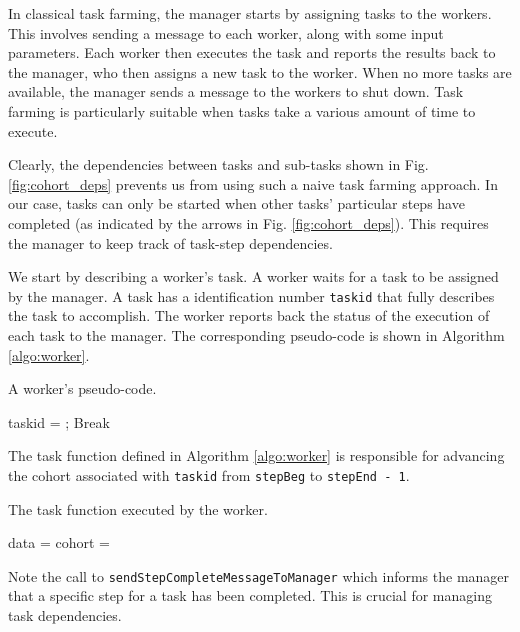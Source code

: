 \documentclass[a4paper,oneside,12pt]{article}
\begin{document}
In classical task farming, the manager starts by assigning tasks to the workers. This involves sending a message to each worker, along with 
some input parameters. Each worker then executes the task and reports the results back to the manager, who then assigns a new task to the worker. 
When no more tasks are available, the manager sends a message to the workers to shut down. Task farming is particularly suitable when tasks 
take a various amount of time to execute.

Clearly, the dependencies between tasks and sub-tasks shown in Fig. \ref{fig:cohort_deps} prevents us from using such a naive task farming approach. 
In our case, tasks can only be started when other tasks' particular steps have completed
(as indicated by the arrows in Fig. \ref{fig:cohort_deps}). This requires the manager to keep track of task-step dependencies.

We start by describing a worker's task. A worker waits for a task to be assigned by the manager. A task has a identification number \verb|taskid| 
that fully describes the task to accomplish. The worker reports back the status of the execution of each task to the manager. 
The corresponding pseudo-code is shown in Algorithm \ref{algo:worker}.

\begin{algorithm}
\caption{A worker's pseudo-code.}
    \begin{algorithmic}[1] %

        taskid = ;
            Break
        \EndIf

        \State {}

        \State {}
    
    \EndWhile
\end{algorithmic}
\label{algo:worker}
\end{algorithm}

The task function defined in Algorithm \ref{algo:worker} is responsible for advancing the cohort associated with \verb|taskid| from \verb|stepBeg| to \verb|stepEnd - 1|.
\begin{algorithm}
\caption{The task function executed by the worker.}
    \begin{algorithmic}[1] %
    \State data = 
    \State cohort = 
        \State {}
        \State {}
    \EndFor
\EndFunction
\end{algorithmic}
\label{algo:worker}
\end{algorithm}
Note the call to \verb|sendStepCompleteMessageToManager| which informs the manager that a specific step for a task has been completed. 
This is crucial for managing task dependencies.
\end{document}
